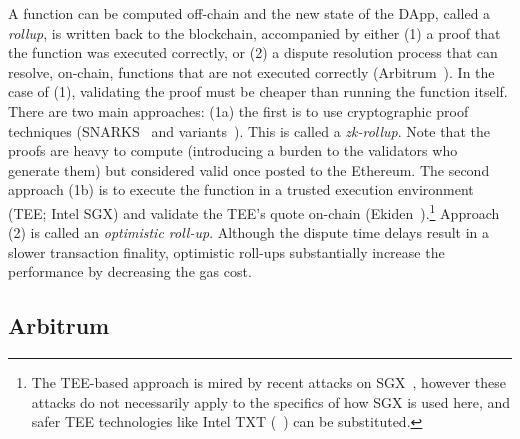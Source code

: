 A function can be computed off-chain and the new state of the DApp, called a \textit{rollup}, is written back to the blockchain, accompanied by either (1) a proof that the function was executed correctly, or (2) a dispute resolution process that can resolve, on-chain, functions that are not executed correctly (\eg Arbitrum~\cite{kalodner2018arbitrum}). In the case of (1), validating the proof must be cheaper than running the function itself. There are two main approaches: (1a) the first is to use cryptographic proof techniques (\eg SNARKS~\cite{BCGTV13,GGPR13} and variants~\cite{BBHR19}). This is called a \textit{zk-rollup}. Note that the proofs are heavy to compute (introducing a burden to the validators who generate them) but considered valid once posted to the Ethereum. The second approach (1b) is to execute the function in a trusted execution environment (TEE; \eg Intel SGX) and validate the TEE's quote on-chain (\eg Ekiden~\cite{cheng2019ekiden}).\footnote{The TEE-based approach is mired by recent attacks on SGX~\cite{SGX1,SGX2,SGX3,SGX4}, however these attacks do not necessarily apply to the specifics of how SGX is used here, and safer TEE technologies like Intel TXT (\cf~\cite{ZBC+19}) can be substituted.} Approach (2) is called an \textit{optimistic roll-up}. Although the dispute time delays result in a slower transaction finality, optimistic roll-ups substantially increase the performance by decreasing the gas cost.



\subsection{Arbitrum}

